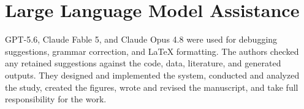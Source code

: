 \section*{Large Language Model Assistance}

GPT-5.6, Claude Fable 5, and Claude Opus 4.8 were used for debugging
suggestions, grammar correction, and LaTeX formatting. The authors checked any
retained suggestions against the code, data, literature, and generated outputs.
They designed and implemented the system, conducted and analyzed the study,
created the figures, wrote and revised the manuscript, and take full
responsibility for the work.
